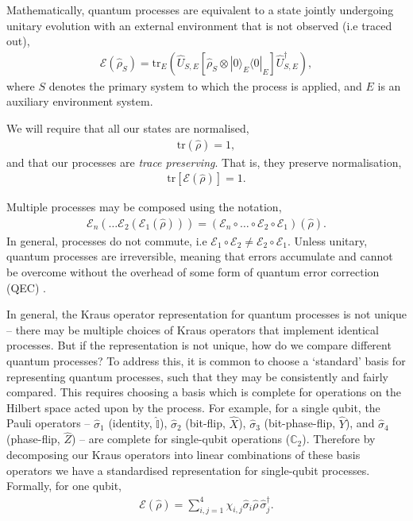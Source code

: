 \documentclass[aps,rmp,twocolumn,amsmath,amssymb,nofootinbib,superscriptaddress,longbibliography,floatfix]{revtex4-1}
\newcommand{\bra}[1]{\langle#1|}
\newcommand{\ket}[1]{|#1\rangle}
\begin{document}
Mathematically, quantum processes are equivalent to a state jointly undergoing unitary evolution with an external environment that is not observed (i.e traced out),
\begin{align} \label{eq:proc_environment}
\mathcal{E}(\hat\rho_S) = \mathrm{tr}_E (\hat{U}_{S,E} [\hat\rho_S\otimes \ket{0}_E\bra{0}_E] \hat{U}^\dag_{S,E}),
\end{align}
where $S$ denotes the primary system to which the process is applied, and $E$ is an auxiliary environment system.

We will require that all our states are normalised,
\begin{align}
\mathrm{tr}(\hat\rho) = 1,
\end{align}
and that our processes are \emph{trace preserving}. That is, they preserve normalisation,
\begin{align}
\mathrm{tr}[\mathcal{E}(\hat\rho)] = 1.
\end{align}

Multiple processes may be composed using the notation,
\begin{align}
\mathcal{E}_n(\dots \mathcal{E}_2(\mathcal{E}_1(\hat\rho)))=(\mathcal{E}_n \circ \dots \circ \mathcal{E}_2\circ\mathcal{E}_1)(\hat\rho).
\end{align}
In general, processes do not commute, i.e \mbox{$\mathcal{E}_1\circ \mathcal{E}_2 \neq \mathcal{E}_2\circ \mathcal{E}_1$}. Unless unitary, quantum processes are irreversible, meaning that errors accumulate and cannot be overcome without the overhead of some form of quantum error correction (QEC) \cite{bib:Shor95, bib:CalderbankShor96, bib:NielsenChuang00}.

In general, the Kraus operator representation for quantum processes is not unique -- there may be multiple choices of Kraus operators that implement identical processes. But if the representation is not unique, how do we compare different quantum processes? To address this, it is common to choose a `standard' basis for representing quantum processes, such that they may be consistently and fairly compared. This requires choosing a basis which is complete for operations on the Hilbert space acted upon by the process. For example, for a single qubit, the Pauli operators -- $\hat\sigma_1$ (identity, $\mathbb{\hat{I}}$), $\hat\sigma_2$ (bit-flip, $\hat{X}$), $\hat\sigma_3$ (bit-phase-flip, $\hat{Y}$), and $\hat\sigma_4$ (phase-flip, $\hat{Z}$) -- are complete for single-qubit operations ($\mathbb{C}_2$). Therefore by decomposing our Kraus operators into linear combinations of these basis operators we have a standardised representation for single-qubit processes. Formally, for one qubit,
\begin{align}
\mathcal{E}(\hat\rho) = \sum_{i,j=1}^4 \chi_{i,j} \hat{\sigma}_i\hat\rho\,\hat{\sigma}_j^\dag.
\end{align}
\end{document}

